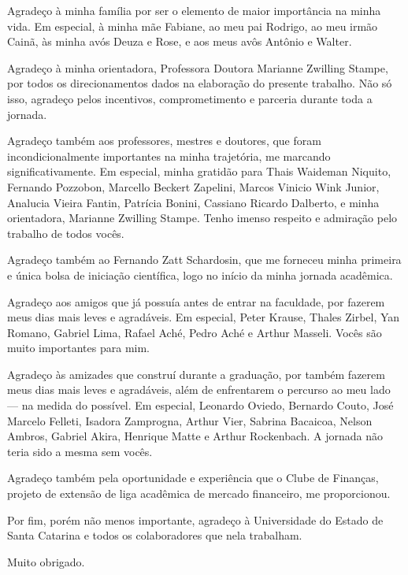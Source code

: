 
\begin{agradecimentos}

Agradeço à minha família por ser o elemento de maior importância na minha vida. Em especial, à minha mãe Fabiane, ao meu pai Rodrigo, ao meu irmão Cainã, às minha avós Deuza e Rose, e aos meus avôs Antônio e Walter.

Agradeço à minha orientadora, Professora Doutora Marianne Zwilling Stampe, por todos os direcionamentos dados na elaboração do presente trabalho. Não só isso, agradeço pelos incentivos, comprometimento e parceria durante toda a jornada.

Agradeço também aos professores, mestres e doutores, que foram incondicionalmente importantes na minha trajetória, me marcando significativamente. Em especial, minha gratidão para Thais Waideman Niquito, Fernando Pozzobon, Marcello Beckert Zapelini, Marcos Vinicio Wink Junior, Analucia Vieira Fantin, Patrícia Bonini, Cassiano Ricardo Dalberto, e minha orientadora, Marianne Zwilling Stampe. Tenho imenso respeito e admiração pelo trabalho de todos vocês.

Agradeço também ao Fernando Zatt Schardosin, que me forneceu minha primeira e única bolsa de iniciação científica, logo no início da minha jornada acadêmica.

Agradeço aos amigos que já possuía antes de entrar na faculdade, por fazerem meus dias mais leves e agradáveis. Em especial, Peter Krause, Thales Zirbel, Yan Romano, Gabriel Lima, Rafael Aché, Pedro Aché e Arthur Masseli. Vocês são muito importantes para mim.

Agradeço às amizades que construí durante a graduação, por também fazerem meus dias mais leves e agradáveis, além de enfrentarem o percurso ao meu lado — na medida do possível. Em especial, Leonardo Oviedo, Bernardo Couto, José Marcelo Felleti, Isadora Zamprogna, Arthur Vier, Sabrina Bacaicoa, Nelson Ambros, Gabriel Akira, Henrique Matte e Arthur Rockenbach. A jornada não teria sido a mesma sem vocês.

Agradeço também pela oportunidade e experiência que o Clube de Finanças, projeto de extensão de liga acadêmica de mercado financeiro, me proporcionou.

Por fim, porém não menos importante, agradeço à Universidade do Estado de Santa Catarina e todos os colaboradores que nela trabalham.

Muito obrigado.

\end{agradecimentos}
